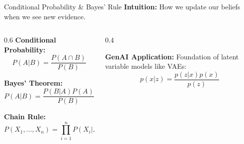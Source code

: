 \documentclass[5pt,aspectratio=169]{beamer}
\begin{document}
\begin{frame}{Conditional Probability \& Bayes' Rule}
\textbf{Intuition:} How we update our beliefs when we see new evidence.
\begin{columns}[T]
\begin{column}{0.6\textwidth}
\textbf{Conditional Probability:}
\[ P(A|B) = \frac{P(A \cap B)}{P(B)} \]

\textbf{Bayes' Theorem:}
\[ P(A|B) = \frac{P(B|A)P(A)}{P(B)} \]

\textbf{Chain Rule:}
\[ P(X_1,\ldots,X_n) = \prod_{i=1}^n P(X_i|X_1,\ldots,X_{i-1}) \]
\end{column}

\begin{column}{0.4\textwidth}
\vspace{0.5cm}
\newline
\textbf{GenAI Application:} Foundation of latent variable models like VAEs:
\[ p(x|z) = \frac{p(z|x)p(x)}{p(z)} \]
\end{column}
\end{columns}


\end{frame}
\end{document}
